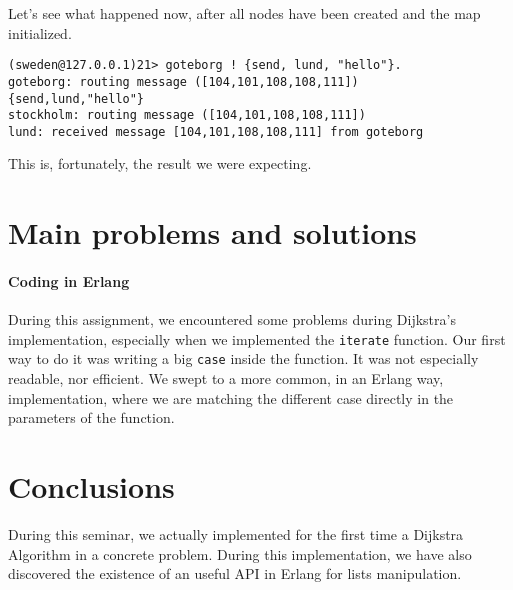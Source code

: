 \documentclass[a4paper, 11pt]{article}
\begin{document}
Let's see what happened now, after all nodes have been created and the map initialized.\\

\begin{lstlisting}
(sweden@127.0.0.1)21> goteborg ! {send, lund, "hello"}.                         goteborg: routing message ([104,101,108,108,111]) 
{send,lund,"hello"}
stockholm: routing message ([104,101,108,108,111]) 
lund: received message [104,101,108,108,111] from goteborg 
\end{lstlisting}

This is, fortunately, the result we were expecting.

\section{Main problems and solutions}

\paragraph{Coding in Erlang}
During this assignment, we encountered some problems during Dijkstra's implementation, especially when we implemented the \lstinline!iterate! function. Our first way to do it was writing a big \lstinline!case! inside the function. It was not especially readable, nor efficient. We swept to a more common, in an Erlang way, implementation, where we are matching the different case directly in the parameters of the function.
 



\section{Conclusions}

During this seminar, we actually implemented for the first time a Dijkstra Algorithm in a concrete problem. During this implementation, we have also discovered the existence of an useful API in Erlang for lists manipulation.
\end{document}
